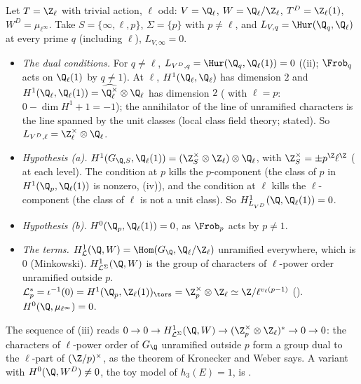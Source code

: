 \begin{example}\label{ex:galcoh:relaxing-toy}
Let $T=\Z_\ell$ with trivial action, $\ell$ odd: $V=\Q_\ell$, $W=\Q_\ell/\Z_\ell$, $T^D=\Z_\ell(1)$, $W^D=\mu_{\ell^\infty}$. Take $S=\{\infty,\ell,p\}$, $\Sigma=\{p\}$ with $p\ne\ell$, and
$L_{V,q}=\Hur(\Q_q,\Q_\ell)$ at every prime $q$ (including $\ell$), $L_{V,\infty}=0$.
\begin{itemize}
\item \emph{The dual conditions.} For $q\ne\ell$, $L_{V^D,q}=\Hur(\Q_q,\Q_\ell(1))=0$ ((ii); $\Frob_q$ acts on $\Q_\ell(1)$ by $q\ne1$). At $\ell$,
$H^1(\Q_\ell,\Q_\ell)$ has dimension $2$ and $H^1(\Q_\ell,\Q_\ell(1))=\widehat{\Q_\ell^\times}\otimes\Q_\ell$ has dimension $2$ ( with $\ell=p$:
$0-\dim H^1+1=-1$); the annihilator of the line of unramified characters is the line spanned by the unit classes (local class field theory; stated). So
$L_{V^D,\ell}=\Z_\ell^\times\otimes\Q_\ell$.
\item \emph{Hypothesis (a).} $H^1(G_{\Q,S},\Q_\ell(1))=(\Z_S^\times\otimes\Z_\ell)\otimes\Q_\ell$, with $\Z_S^\times=\pm p^{\Z}\ell^{\Z}$ ( at each level). The
condition at $p$ kills the $p$-component (the class of $p$ in $H^1(\Q_p,\Q_\ell(1))$ is nonzero, (iv)), and the condition at $\ell$ kills the
$\ell$-component (the class of $\ell$ is not a unit class). So $H^1_{L_{V^D}}(\Q,\Q_\ell(1))=0$.
\item \emph{Hypothesis (b).} $H^0(\Q_p,\Q_\ell(1))=0$, as $\Frob_p$ acts by $p\ne1$.
\item \emph{The terms.} $H^1_{\mathcal L}(\Q,W)=\Hom(G_\Q,\Q_\ell/\Z_\ell)$ unramified everywhere, which is $0$ (Minkowski). $H^1_{\mathcal L^\Sigma}(\Q,W)$ is the group of characters of
$\ell$-power order unramified outside $p$. $\mathcal L^*_p=\iota^{-1}(0)=H^1(\Q_p,\Z_\ell(1))_{\tors}=\Z_p^\times\otimes\Z_\ell\simeq\Z/\ell^{v_\ell(p-1)}$ ().
$H^0(\Q,\mu_{\ell^\infty})=0$.
\end{itemize}
The sequence of (iii) reads $0\to0\to H^1_{\mathcal L^\Sigma}(\Q,W)\to(\Z_p^\times\otimes\Z_\ell)^*\to0\to0$: the characters of $\ell$-power order of $G_\Q$ unramified
outside $p$ form a group dual to the $\ell$-part of $(\Z/p)^\times$, as the theorem of Kronecker and Weber says. A variant with $H^0(\Q,W^D)\ne0$, the toy model of $h_3(E)=1$,
is .
\end{example}


